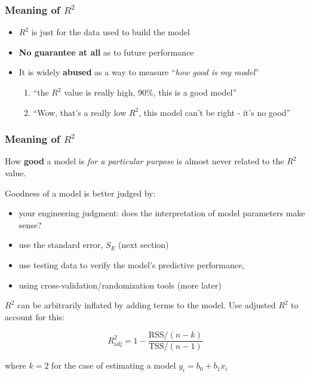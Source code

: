 \begin{frame}\frametitle{Meaning of $R^2$}
	\begin{itemize}
		\item	$R^2$ is just for the data used to build the model
		\item	\textbf{No guarantee at all} as to future performance
		\item	It is widely \textbf{abused} as a way to measure ``\emph{how good is my model}''
		\begin{enumerate}
			\item	``the $R^2$ value is really high, 90\%, this is a good model''
			\item	``Wow, that's a really low $R^2$, this model can't be right - it's no good''
		\end{enumerate}
	\end{itemize}
\end{frame}

\begin{frame}\frametitle{Meaning of $R^2$}
	\begin{exampleblock}{}
		How \textbf{good} a model is \emph{for a particular purpose} is almost never related to the $R^2$ value.
	\end{exampleblock}

	\vspace{12pt}
	Goodness of a model is better judged by:
	\begin{itemize}
		\item	your engineering judgment: does the interpretation of model parameters make sense?
		\item	use the standard error, $S_E$ (next section)
		\item	use testing data to verify the model's predictive performance,
		\item	using cross-validation/randomization tools (more later)
	\end{itemize}

	$R^2$ can be arbitrarily inflated by adding terms to the model. Use adjusted $R^2$ to account for this:

	$$ R^2_\text{adj} = 1 - \dfrac{\text{RSS}/(n-k)}{\text{TSS}/(n-1)} $$

	where $k=2$ for the case of estimating a model $y_i = b_0 + b_1 x_i$
\end{frame}

